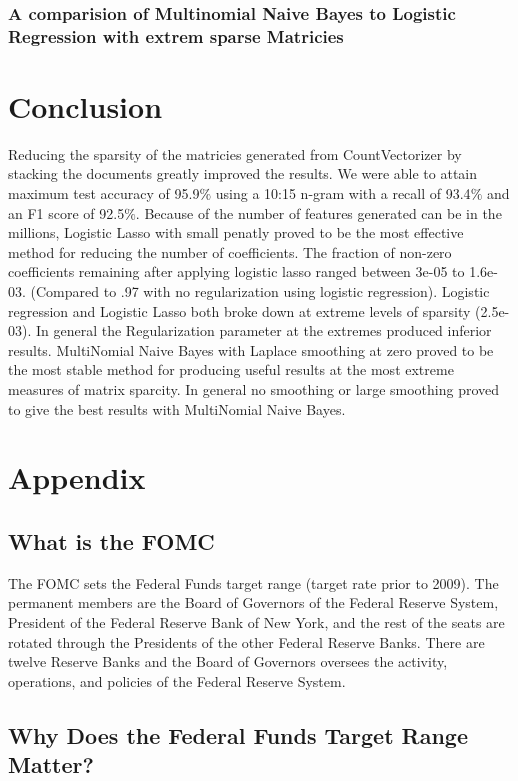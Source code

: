 \documentclass[11pt]{article}
\begin{document}
{\subsubsection{A comparision of Multinomial Naive Bayes to Logistic Regression with extrem sparse Matricies}



\section{Conclusion}
Reducing the sparsity of the matricies generated from CountVectorizer by stacking the documents greatly improved the results.
We were able to attain maximum test accuracy of 95.9$\%$ using a 10:15 n-gram with a recall of 93.4$\%$ and an F1 score of 92.5$\%$.
Because of the number of features generated can be in the millions, Logistic Lasso with small penatly proved to be the most effective 
method for reducing the number of coefficients.
The fraction of non-zero coefficients remaining after applying logistic lasso
ranged between 3e-05 to 1.6e-03.  (Compared to .97 with no regularization using logistic regression).
Logistic regression and Logistic Lasso both broke down at extreme levels of sparsity 
(2.5e-03).
In general the Regularization parameter at the extremes produced inferior results.
MultiNomial Naive Bayes with Laplace smoothing at zero proved to be the most stable method for producing useful results at the
most extreme measures of matrix sparcity.  In general no smoothing or large smoothing proved to give the best results with
MultiNomial Naive Bayes.

\appendix
\section{Appendix}

\subsection{What is the FOMC}

The FOMC sets the Federal Funds target range (target rate prior to 2009).  The permanent members are the Board of Governors of the Federal Reserve System, President of the Federal Reserve Bank of New York, and the rest of the seats are rotated through the Presidents of the other Federal Reserve Banks.  There are twelve Reserve Banks and the Board of Governors oversees the activity, operations, and policies of the Federal Reserve System.   

\subsection{Why Does the Federal Funds Target Range Matter?}

}
\end{document}
